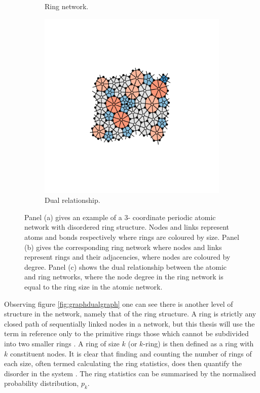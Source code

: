 \begin{figure}[h]
\begin{subfigure}[b]{0.3\textwidth}
         \caption{Ring network.}
         \label{fig:graphdualdual}
     \end{subfigure}
     \hfill
     \begin{subfigure}[b]{0.3\textwidth}
         \centering
         \includegraphics[width=\textwidth]{./figures/methods/graph_dual.pdf}
         \caption{Dual relationship.}
         \label{}
     \end{subfigure}
     \hfill
     
     \caption{Panel (a) gives an example of a 3\-- coordinate periodic atomic network with disordered ring structure. Nodes and links represent atoms and bonds respectively where rings are coloured by size. Panel (b) gives the corresponding ring network where nodes and links represent rings and their adjacencies, where nodes are coloured by degree. Panel (c) shows the dual relationship between the atomic and ring networks, where the node degree in the ring network is equal to the ring size in the atomic network.}
     \label{fig:graphdual}
\end{figure}

Observing figure \ref{fig:graphdualgraph} one can see there is another level of structure in the network, namely that of the ring structure.
A ring is strictly any closed path of sequentially linked nodes in a network, but this thesis will use the term in reference only to the primitive rings \ie{} those which cannot be subdivided into two smaller rings \cite{Yuan2002}.
A ring of size $k$ (or $k$\--ring) is then defined as a ring with $k$ constituent nodes.
It is clear that finding and counting the number of rings of each size, often termed calculating the ring statistics, does then quantify the disorder in the system \cite{Kumar2014}.
The ring statistics can be summarised by the normalised probability distribution, $p_k$.

